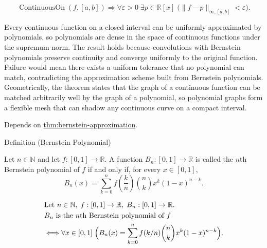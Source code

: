 \begin{remark*}
\[
\operatorname{ContinuousOn}(f,[a,b])
\Longrightarrow
\forall \varepsilon>0\;\exists p\in\mathbb{R}[x]\;
\bigl(\|f-p\|_{\infty,[a,b]}<\varepsilon\bigr).
\]
\end{remark*}

\begin{remark*}[Interpretation]
Every continuous function on a closed interval can be uniformly approximated by polynomials, so polynomials are dense in the space of continuous functions under the supremum norm. The result holds because convolutions with Bernstein polynomials preserve continuity and converge uniformly to the original function. Failure would mean there exists a uniform tolerance that no polynomial can match, contradicting the approximation scheme built from Bernstein polynomials. Geometrically, the theorem states that the graph of a continuous function can be matched arbitrarily well by the graph of a polynomial, so polynomial graphs form a flexible mesh that can shadow any continuous curve on a compact interval.
\end{remark*}

\begin{dependencies}
Depends on \hyperref[thm:bernstein-approximation]{thm:bernstein-approximation}.
\end{dependencies}


\begin{definitionbox}{Definition (Bernstein Polynomial)}
\begin{definition}
\label{def:bernstein-polynomial}
Let $n \in \mathbb{N}$ and let $f:[0,1]\to\mathbb{R}$.
A function $B_n:[0,1]\to\mathbb{R}$ is called the $n$th Bernstein polynomial of $f$
if and only if, for every $x \in [0,1]$,
\[
B_n(x)=\sum_{k=0}^{n} f\!\left(\frac{k}{n}\right)\binom{n}{k}x^k(1-x)^{n-k}.
\]
\end{definition}
\end{definitionbox}

\begin{remark*}
\[
\begin{aligned}
&\text{Let }n\in\mathbb{N},\; f:[0,1]\to\mathbb{R},\; B_n:[0,1]\to\mathbb{R}.\\
&B_n \text{ is the } n\text{th Bernstein polynomial of } f\\
&\Longleftrightarrow
\forall x\in[0,1]\;
\Bigl(
B_n(x)=\sum_{k=0}^n f(k/n)\binom{n}{k}x^k(1-x)^{n-k}
\Bigr).
\end{aligned}
\]
\end{remark*}

